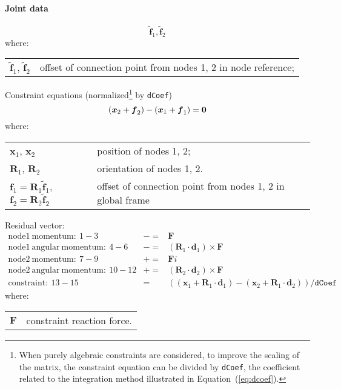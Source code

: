 \documentclass[10pt,dvips,fleqn]{report}
\newcommand{\T}[1]{\boldsymbol{#1}}
\begin{document}
\paragraph{Joint data}
\begin{equation}
	\tilde{\T{f}}_1, \tilde{\T{f}}_2
\end{equation}
where:

\noindent
\begin{tabular}{ll}
$\tilde{\T{f}}_1$, $\tilde{\T{f}}_2$ & offset of connection point from nodes 1, 2 in node reference; \\
\end{tabular}

\noindent
Constraint equations (normalized\footnote{When purely algebraic
constraints are considered, to improve the scaling of the matrix,
the constraint equation can be divided by \texttt{dCoef},
the coefficient related to the integration method illustrated 
in Equation~(\ref{eq:dcoef}).
} by \texttt{dCoef})
\begin{equation}
	\plbr{\T{x}_2 + \T{f}_2} - \plbr{\T{x}_1 + \T{f}_1} = \T{0}
\end{equation}
where:

\noindent
\begin{tabular}{ll}
$\T{x}_1$, $\T{x}_2$ & position of nodes 1, 2; \\
$\T{R}_1$, $\T{R}_2$ & orientation of nodes 1, 2.\\
$\T{f}_1 = \T{R}_1 \tilde{\T{f}}_1$, $\T{f}_2 = \T{R}_2 \tilde{\T{f}}_2$ & offset of connection point from nodes 1, 2 in global frame
\end{tabular}

\noindent
Residual vector:
\begin{eqnarray*}
	\mathrm{node1\ momentum}:\ 1-3& -= & \T F \\
	\mathrm{node1\ angular\ momentum}:\ 4-6& -= & 
		(\T R_1\cdot \T d_1) \times \T F \\
	\mathrm{node2\ momentum}:\ 7-9& += & \T Fi \\
	\mathrm{node2\ angular\ momentum}:\ 10-12& += & 
		(\T R_2\cdot \T d_2) \times \T F \\
	\mathrm{constraint}:\ 13-15& = &  ((\T x_1+\T R_1\cdot \T d_1) - 
			(\T x_2+\T R_1\cdot \T d_2))/\texttt{dCoef}
\end{eqnarray*}
where:

\noindent
\begin{tabular}{ll}
$\T{F}$ & constraint reaction force.
\end{tabular}
\end{document}
